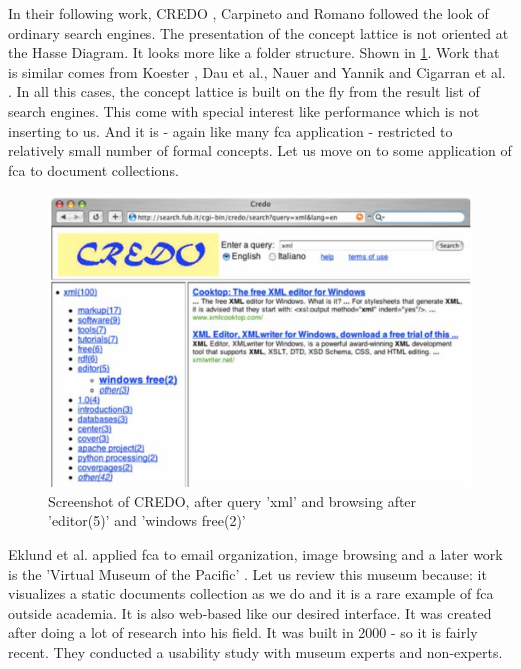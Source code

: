\documentclass[11pt]{report}
\begin{document}
{{In their following work, CREDO \cite{Carpineto2004}, Carpineto and Romano followed the look of ordinary search engines. The presentation of the concept lattice is not oriented at the Hasse Diagram. It looks more like a folder structure. Shown in \ref{figure:credo}. Work that is similar comes from Koester \cite{Koester2006}, Dau et al.\cite{Dau2008}, Nauer and Yannik \cite{Nauer2009} and Cigarran et al. \cite{Cigarran2004}. In all this cases, the concept lattice is built on the fly from the result list of search engines. This come with special interest like performance which is not inserting to us. And it is - again like many \acrshort{fca} application - restricted to relatively small number of formal concepts. Let us move on to some application of \acrshort{fca} to document collections. \\

\begin{figure}[!ht]
	\centering
	\includegraphics[width=\linewidth]{images/credo}
\caption{Screenshot of CREDO, after query 'xml' and browsing after 'editor(5)' and 'windows free(2)' \cite{Carpineto2004} }
\label{figure:credo}
\end{figure}

Eklund et al. applied \acrshort{fca} to email organization\cite{Eklund2004}, image browsing \cite{Ducrou2006,Ducrou2008} and a later work is the 'Virtual Museum of the Pacific' \cite{Eklund2009,Eklund2012}. Let us review this museum because: it visualizes a static documents collection as we do and it is a rare example of \acrshort{fca} outside academia. It is also web-based like our desired interface. It was created after doing a lot of research into his field. It was built in 2000 - so it is fairly recent. They conducted a usability study with museum experts and non-experts. \cite{Eklund2012}

}}
\end{document}
